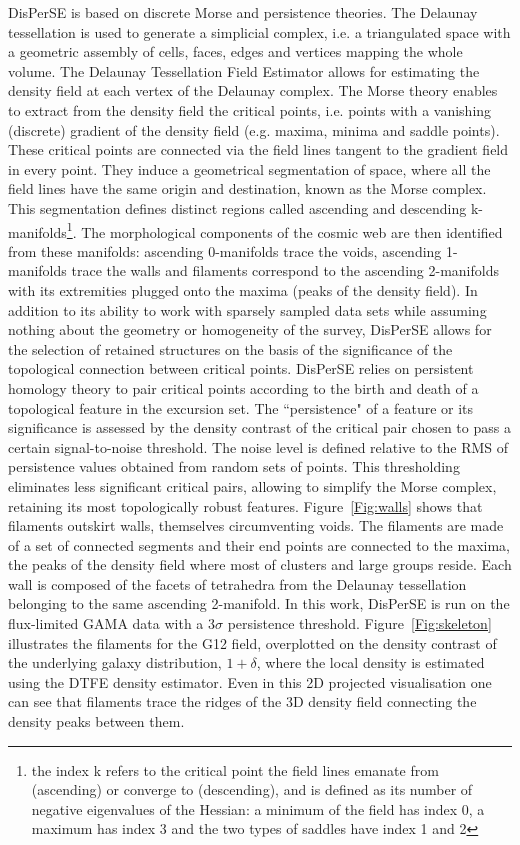 \documentclass[useAMS,usenatbib]{mnras}
\begin{document}
DisPerSE is based on discrete Morse and persistence theories.
The Delaunay tessellation is used to generate a simplicial complex, i.e. a triangulated space with a geometric assembly of cells, faces, edges and vertices mapping the whole volume.  The Delaunay Tessellation Field Estimator \citep[DTFE;][]{Schaap2000, cautun2011} allows for estimating the density field at each vertex of the Delaunay  complex.  
The Morse theory enables to extract from the density field the critical points, i.e. points with a vanishing (discrete) gradient of the density field (e.g. maxima, minima and saddle points). These critical points are connected via the field lines tangent to the gradient field in every point. They induce a geometrical segmentation of space, where all the field lines have the same origin and destination, known as the Morse complex. This segmentation defines distinct regions called ascending and descending k-manifolds\footnote{the index k refers to the critical point the field lines emanate from (ascending) or converge to (descending), and is defined as its number of negative eigenvalues of the Hessian: a minimum of the field has index 0, a maximum has index 3 and the two types of saddles have index 1 and 2}. The morphological components of the cosmic web are then identified from these manifolds:  ascending 0-manifolds trace the voids, ascending 1-manifolds trace the walls and filaments correspond to the ascending 2-manifolds with its extremities plugged onto the maxima (peaks of the density field).
In addition to its ability to work with sparsely sampled data sets while assuming nothing about the geometry or homogeneity of the survey, 
DisPerSE allows for the selection of retained structures on the basis of the significance of the topological connection between critical points.
DisPerSE relies on persistent homology theory to pair  critical points according to the birth and death of a topological feature in the excursion set. 
The ``persistence" of a feature or its significance is assessed by the density contrast of the critical pair chosen to pass a certain signal-to-noise threshold. The noise level is defined relative to the RMS of persistence values obtained from random sets of points.
This thresholding eliminates less significant critical pairs, allowing to simplify the Morse complex, retaining its most topologically robust features. 
Figure~\ref{Fig:walls} shows that filaments outskirt walls, themselves circumventing voids. 
The filaments are made of a set of connected segments and their end points are connected to the maxima, the peaks of the density field where most of clusters and  large groups reside. Each wall is composed of the facets of tetrahedra from the Delaunay tessellation belonging to the same ascending 2-manifold.
%
In this work, DisPerSE is run on the flux-limited GAMA data with a 3$\sigma$ persistence threshold.
Figure~\ref{Fig:skeleton} illustrates the filaments for the G12 field, overplotted on the density contrast of the underlying galaxy distribution, $1 + \delta$, where the local density is estimated using the DTFE density estimator.
Even in this 2D projected visualisation one can see that filaments trace the ridges of the 3D density field connecting the density peaks between them.  
%
\end{document}
